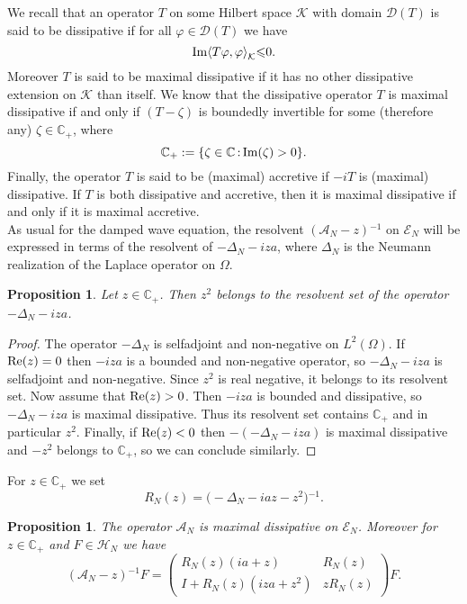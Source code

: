 \documentclass[10pt, a4paper,reqno]{amsart}
\theoremstyle{plain}
\newtheorem{proposition}[theorem]{Proposition}
\theoremstyle{definition}
\theoremstyle{remark}
\begin{document}
We recall that an operator $T$ on some Hilbert space ${{\mathcal K}}$ with domain ${{\mathcal D}}(T)$ is said to be dissipative if for all ${\varphi} \in {{\mathcal D}}(T)$ we have 
\[
{\mathop{\rm{Im}}\nolimits} {\left< {T{\varphi}} , {\varphi} \right>}_{{\mathcal K}} {\leqslant} 0.
\]
Moreover $T$ is said to be maximal dissipative if it has no other dissipative extension on ${{\mathcal K}}$ than itself. We know that the dissipative operator $T$ is maximal dissipative if and only if $(T-{\zeta})$ is boundedly invertible for some (therefore any) ${\zeta} \in {\mathbb{C}}_+$, where
\[
{\mathbb{C}}_+ : = {\left\{ {{\zeta} \in {\mathbb{C}} {\,:\,} {\mathop{\rm{Im}}\nolimits}({\zeta}) > 0} \right\}}.
\]
Finally, the operator $T$ is said to be (maximal) accretive if $-iT$ is (maximal) dissipative. If $T$ is both dissipative and accretive, then it is maximal dissipative if and only if it is maximal accretive.\\

As usual for the damped wave equation, the resolvent $({{{\mathcal A}}_N}-z){^{-1}}$ on ${\mathscr E_N}$ will be expressed in terms of the resolvent of $-{{\Delta}_N}- iza$, where ${{\Delta}_N}$ is the Neumann realization of the Laplace operator on ${\Omega}$.

\begin{proposition}
Let $z \in {\mathbb{C}}_+$. Then $z^2$ belongs to the resolvent set of the operator $-{{\Delta}_N}- iz a$.
\end{proposition}

\begin{proof}
The operator $-{{\Delta}_N}$ is selfadjoint and non-negative on $L^2({\Omega})$. If ${\mathop{\rm{Re}}\nolimits}(z) = 0$ then $-iza$ is a bounded and non-negative operator, so $-{{\Delta}_N}-iza$ is selfadjoint and non-negative. Since $z^2$ is real negative, it belongs to its resolvent set. Now assume that ${\mathop{\rm{Re}}\nolimits}(z) > 0$. Then $-iza$ is bounded and dissipative, so $-{{\Delta}_N}-iza$ is maximal dissipative. Thus its resolvent set contains ${\mathbb{C}}_+$ and in particular $z^2$. Finally, if ${\mathop{\rm{Re}}\nolimits}(z) < 0$ then $-(-{{\Delta}_N}-iza)$ is maximal dissipative and $-z^2$ belongs to ${\mathbb{C}}_+$, so we can conclude similarly.
\end{proof}

For $z \in {\mathbb{C}}_+$ we set 
\[
{R_N(z)} = \big( - {{\Delta}_N}  -iaz -z^2 \big){^{-1}}.
\]

\begin{proposition} \label{prop-AcN-diss}
The operator ${{{\mathcal A}}_N}$ is maximal dissipative on ${\mathscr E_N}$. Moreover for $z \in {\mathbb{C}}_+$ and $F \in {\mathcal H_N}$ we have 
\begin{equation} \label{expr-res}
({{\mathcal A}}_N-z){^{-1}} F =
\begin{pmatrix}
{R_N(z)} (ia + z) & {R_N(z)} \\
I + {R_N(z)} (iza + z^2) & z {R_N(z)}
\end{pmatrix}F.
\end{equation}
\end{proposition}
\end{document}
